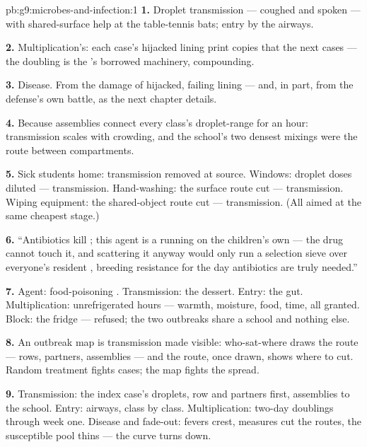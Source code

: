 \begin{solution}{pb:g9:microbes-and-infection:1}
\textbf{1.} Droplet transmission --- coughed and spoken
--- with shared-surface help at the table-tennis bats;
entry by the airways.

\textbf{2.} Multiplication's: each case's hijacked lining
 print copies that  the next cases --- the
doubling is the 's borrowed machinery, compounding.

\textbf{3.} Disease. From the damage of hijacked, failing
lining  --- and, in part, from the defense's own
battle, as the next chapter details.

\textbf{4.} Because assemblies connect every class's
droplet-range for an hour: transmission scales with
crowding, and the school's two densest mixings were the
route between compartments.

\textbf{5.} Sick students home: transmission removed at
source. Windows: droplet doses diluted --- transmission.
Hand-washing: the surface route cut --- transmission.
Wiping equipment: the shared-object route cut ---
transmission. (All aimed at the same cheapest stage.)

\textbf{6.} ``Antibiotics kill ; this agent is a
 running on the children's own  --- the drug
cannot touch it, and scattering it anyway would only run
a selection sieve over everyone's resident ,
breeding resistance for the day antibiotics are truly
needed.''

\textbf{7.} Agent: food-poisoning . Transmission:
the dessert. Entry: the gut. Multiplication: unrefrigerated
hours --- warmth, moisture, food, time, all granted.
Block: the fridge ---  refused; the two
outbreaks share a school and nothing else.

\textbf{8.} An outbreak map is transmission made visible:
who-sat-where draws the route --- rows, partners,
assemblies --- and the route, once drawn, shows where to
cut. Random treatment fights cases; the map fights the
spread.

\textbf{9.} Transmission: the index case's droplets, row
and partners first, assemblies to the school. Entry:
airways, class by class. Multiplication: two-day
doublings through week one. Disease and fade-out: fevers
crest, measures cut the routes, the susceptible pool
thins --- the curve turns down.


\end{solution}
